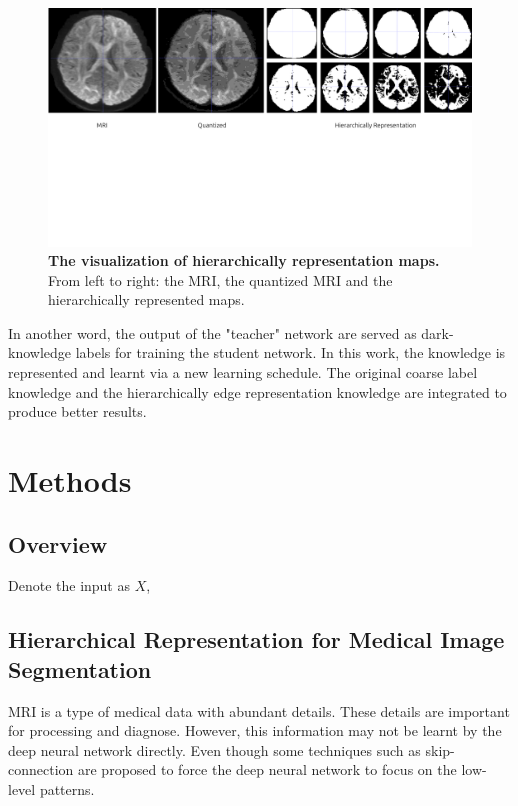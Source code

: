 \documentclass[10pt,twocolumn,letterpaper]{article}
\begin{document}
\begin{figure}[t]
  \centering
   \includegraphics[width=1\linewidth]{./figs/HR.pdf}
   \caption{\textbf{The visualization of hierarchically representation maps.} 
   From left to right: the MRI, the quantized MRI and the hierarchically represented maps. }
   \label{fig:hr}
\end{figure}


In another word, the output of the "teacher" network are served as dark-knowledge labels for training the student network. 
In this work, the knowledge is represented and learnt via a new learning schedule. The original coarse label knowledge and the hierarchically edge representation knowledge are integrated to produce better results. 

\section{Methods}

\subsection{Overview}

Denote the input as $X$, 


\subsection{Hierarchical Representation for Medical Image Segmentation}

 
MRI is a type of medical data with abundant details. These details are important for processing and diagnose. 
However, this information may not be learnt by the deep neural network directly. 
Even though some techniques such as skip-connection are proposed to force the deep neural network to focus on the low-level patterns. 
\end{document}
